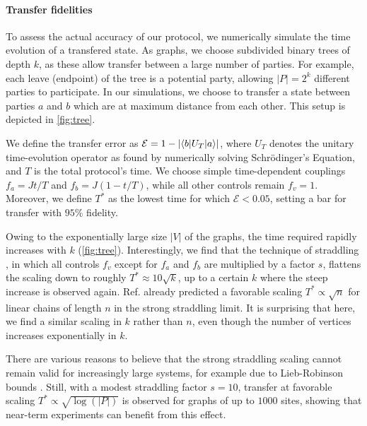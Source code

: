 \paragraph{Transfer fidelities}
To assess the actual accuracy of our protocol, we numerically simulate the time evolution of a transfered state. As graphs, we choose subdivided binary trees of depth $k$, as these allow transfer between a large number of parties. For example, each leave (endpoint) of the tree is a potential party, allowing $|P| = 2^k$ different parties to participate. In our simulations, we choose to transfer a state between parties $a$ and $b$ which are at maximum distance from each other. This setup is depicted in \cref{fig:tree}. 

We define the transfer error as $\mathcal{E} = 1-| \langle b\rvert U_T \lvert a\rangle|$, where $U_T$ denotes the unitary time-evolution operator as found by numerically solving Schr\"{o}dinger's Equation, and $T$ is the total protocol's time. We choose simple time-dependent couplings $f_a = J t/T$ and $f_b = J ( 1-t/T )$, while all other controls remain $f_v = 1$. Moreover, we define $T^*$ as the lowest time for which $\mathcal{E} < 0.05$, setting a bar for transfer with $95\%$ fidelity. 

Owing to the exponentially large size $|V|$ of the graphs, the time required rapidly increases with $k$ (\cref{fig:tree}). Interestingly, we find that the technique of straddling  \cite{Malinovsky1997,Greentree2004}, in which all controls $f_v$ except for $f_a$ and $f_b$ are multiplied by a factor $s$, flattens the scaling down to roughly $T^* \approx 10 \sqrt{k}$, up to a certain $k$ where the steep increase is observed again. Ref. \cite{Greentree2005} already predicted a favorable scaling $T^* \propto \sqrt{n}$ for linear chains of length $n$ in the strong straddling limit. It is surprising that here, we find a similar scaling in $k$ rather than $n$, even though the number of vertices increases exponentially in $k$.
 
There are various reasons to believe that the strong straddling scaling cannot remain valid for increasingly large systems, for example due to Lieb-Robinson bounds \cite{Lieb1972}. Still, with a modest straddling factor $s = 10$, transfer at favorable scaling $T^*\propto \sqrt{\log(|P|)}$ is observed for graphs of up to $1000$ sites, showing that near-term experiments can benefit from this effect. 



